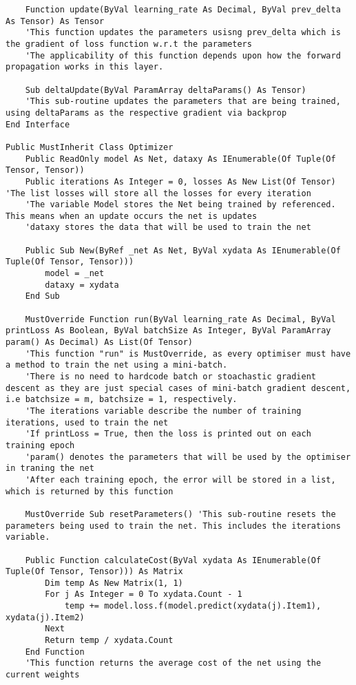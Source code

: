 \begin{verbatim}
    Function update(ByVal learning_rate As Decimal, ByVal prev_delta As Tensor) As Tensor
    'This function updates the parameters usisng prev_delta which is the gradient of loss function w.r.t the parameters
    'The applicability of this function depends upon how the forward propagation works in this layer.

    Sub deltaUpdate(ByVal ParamArray deltaParams() As Tensor)
    'This sub-routine updates the parameters that are being trained, using deltaParams as the respective gradient via backprop
End Interface

Public MustInherit Class Optimizer
    Public ReadOnly model As Net, dataxy As IEnumerable(Of Tuple(Of Tensor, Tensor))
    Public iterations As Integer = 0, losses As New List(Of Tensor) 'The list losses will store all the losses for every iteration
    'The variable Model stores the Net being trained by referenced. This means when an update occurs the net is updates
    'dataxy stores the data that will be used to train the net

    Public Sub New(ByRef _net As Net, ByVal xydata As IEnumerable(Of Tuple(Of Tensor, Tensor)))
        model = _net
        dataxy = xydata
    End Sub

    MustOverride Function run(ByVal learning_rate As Decimal, ByVal printLoss As Boolean, ByVal batchSize As Integer, ByVal ParamArray param() As Decimal) As List(Of Tensor)
    'This function "run" is MustOverride, as every optimiser must have a method to train the net using a mini-batch.
    'There is no need to hardcode batch or stoachastic gradient descent as they are just special cases of mini-batch gradient descent, i.e batchsize = m, batchsize = 1, respectively.
    'The iterations variable describe the number of training iterations, used to train the net
    'If printLoss = True, then the loss is printed out on each training epoch
    'param() denotes the parameters that will be used by the optimiser in traning the net
    'After each training epoch, the error will be stored in a list, which is returned by this function

    MustOverride Sub resetParameters() 'This sub-routine resets the parameters being used to train the net. This includes the iterations variable.

    Public Function calculateCost(ByVal xydata As IEnumerable(Of Tuple(Of Tensor, Tensor))) As Matrix
        Dim temp As New Matrix(1, 1)
        For j As Integer = 0 To xydata.Count - 1
            temp += model.loss.f(model.predict(xydata(j).Item1), xydata(j).Item2)
        Next
        Return temp / xydata.Count
    End Function
    'This function returns the average cost of the net using the current weights


\end{verbatim}
